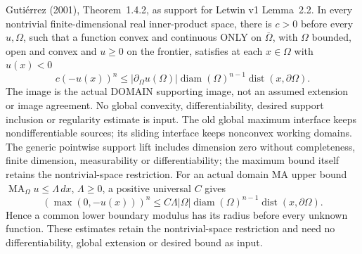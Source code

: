 \begin{lemma}
  \label{lem:domain-alexandrov-maximum}
  \leanok
  Guti\'errez (2001), Theorem~1.4.2, as support for Letwin v1 Lemma~2.2.
  In every nontrivial finite-dimensional real inner-product space, there is
  $c>0$ before every $u,\Omega$, such that a function convex and continuous
  ONLY on $\overline\Omega$, with $\Omega$ bounded, open and convex and
  $u\ge0$ on the frontier, satisfies at each $x\in\Omega$ with $u(x)<0$
  \[
    c(-u(x))^n\le |\partial_\Omega u(\Omega)|
       \operatorname{diam}(\Omega)^{n-1}\operatorname{dist}(x,\partial\Omega).
  \]
  The image is the actual DOMAIN supporting image, not an assumed extension
  or image agreement. No global convexity, differentiability, desired support
  inclusion or regularity estimate is input. The old global maximum interface
  keeps nondifferentiable sources; its sliding interface keeps nonconvex
  working domains. The generic pointwise support lift includes dimension zero
  without completeness, finite dimension, measurability or differentiability;
  the maximum bound itself retains the nontrivial-space restriction.
For an actual domain MA upper bound $\operatorname{MA}_\Omega u\le\Lambda\,dx$,
  $\Lambda\ge0$, a positive universal $C$ gives
  \[
  (\max(0,-u(x)))^n\le C\Lambda|\Omega|\operatorname{diam}(\Omega)^{n-1}
       \operatorname{dist}(x,\partial\Omega).
  \]
  Hence a common lower boundary modulus has its radius before every unknown
  function. These estimates retain the nontrivial-space restriction and need
  no differentiability, global extension or desired bound as input.
\end{lemma}
